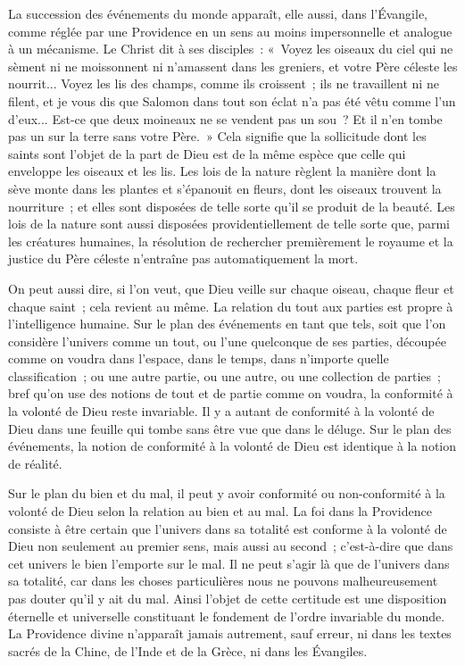 \documentclass[french,twoside]{book} %
\begin{document}
La succession des événements du monde apparaît, elle aussi, dans l'Évangile, comme réglée par une Providence en un sens au moins impersonnelle et analogue à un mécanisme. Le Christ dit à ses disciples : « Voyez les oiseaux du ciel qui ne sèment ni ne moissonnent ni n'amassent dans les greniers, et votre Père céleste les nourrit... Voyez les lis des champs, comme ils croissent ; ils ne travaillent ni ne filent, et je vous dis que Salomon dans tout son éclat n'a pas été vêtu comme l'un d'eux... Est-ce que deux moineaux ne se vendent pas un sou ? Et il n'en tombe pas un sur la terre sans votre Père. » Cela signifie que la sollicitude dont les saints sont l'objet de la part de Dieu est de la même espèce que celle qui enveloppe les oiseaux et les lis. Les lois de la nature règlent la manière dont la sève monte dans les plantes et s'épanouit en fleurs, dont les oiseaux trouvent la nourriture ; et elles sont disposées de telle sorte qu'il se produit de la beauté. Les lois de la nature sont aussi disposées providentiellement de telle sorte que, parmi les créatures humaines, la résolution de rechercher premièrement le royaume et la justice du Père céleste n'entraîne pas automatiquement la mort.\par
On peut aussi dire, si l'on veut, que Dieu veille sur chaque oiseau, chaque fleur et chaque saint ; cela revient au même. La relation du tout aux parties est propre à l'intelligence humaine. Sur le plan des événements en tant que tels, soit que l'on considère l'univers comme un tout, ou l'une quelconque de ses parties, découpée comme on voudra dans l'espace, dans le temps, dans n'importe quelle classification ; ou une autre partie, ou une autre, ou une collection de parties ; bref qu'on use des notions de tout et de partie comme on voudra, la conformité à la volonté de Dieu reste invariable. Il y a autant de conformité à la volonté de Dieu dans une feuille qui tombe sans être vue que dans le déluge. Sur le plan des événements, la notion de conformité à la volonté de Dieu est identique à la notion de réalité.\par
Sur le plan du bien et du mal, il peut y avoir conformité ou non-conformité à la volonté de Dieu selon la relation au bien et au mal. La foi dans la Providence consiste à être certain que l'univers dans sa totalité est conforme à la volonté de Dieu non seulement au premier sens, mais aussi au second ; c'est-à-dire que dans cet univers le bien l'emporte sur le mal. Il ne peut s'agir là que de l'univers dans sa totalité, car dans les choses particulières nous ne pouvons malheureusement pas douter qu'il y ait du mal. Ainsi l'objet de cette certitude est une disposition éternelle et universelle constituant le fondement de l'ordre invariable du monde. La Providence divine n'apparaît jamais autrement, sauf erreur, ni dans les textes sacrés de la Chine, de l'Inde et de la Grèce, ni dans les Évangiles.\par
\end{document}
